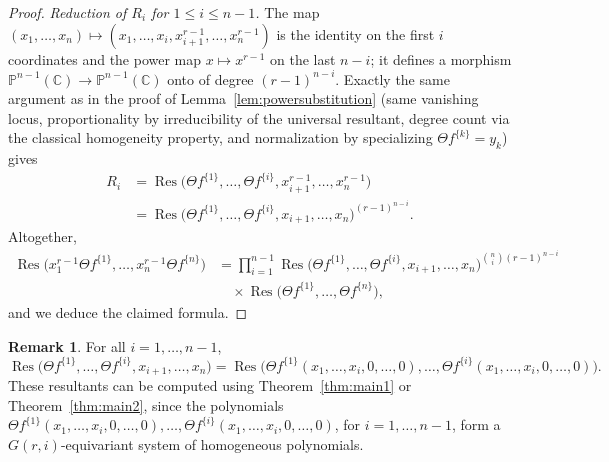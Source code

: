 \documentclass[12pt]{amsart}
\theoremstyle{definition}
\newtheorem{remark}[theorem]{Remark}
\newcommand{\Res}{\operatorname{Res}}
\begin{document}
\begin{proof}
\emph{Reduction of $R_i$ for $1\leqslant i \leqslant n-1$.} The map $(x_1,\dots,x_n) \mapsto (x_1,\dots,x_i,x_{i+1}^{r-1},\dots,x_n^{r-1})$ is the identity on the first $i$ coordinates and the power map $x\mapsto x^{r-1}$ on the last $n-i$; it defines a morphism $\mathbb{P}^{n-1}(\mathbb{C})\to\mathbb{P}^{n-1}(\mathbb{C})$ onto of degree $(r-1)^{n-i}$. Exactly the same argument as in the proof of Lemma~\ref{lem:powersubstitution} (same vanishing locus, proportionality by irreducibility of the universal resultant, degree count via the classical homogeneity property, and normalization by specializing $\Theta f^{\{k\}}=y_k$) gives
\begin{align*}
R_i &= \Res\big(\Theta f^{\{1\}},\dots,\Theta f^{\{i\}},x_{i+1}^{r-1},\dots,x_n^{r-1}\big) \\
&= \Res\big(\Theta f^{\{1\}},\dots,\Theta f^{\{i\}},x_{i+1},\dots,x_n\big)^{(r-1)^{n-i}}.
\end{align*}
Altogether,
\begin{align*}
\Res\big(x_1^{r-1}\Theta f^{\{1\}},\dots,x_n^{r-1}\Theta f^{\{n\}}\big) &= \prod_{i=1}^{n-1}\Res\big(\Theta f^{\{1\}},\dots,\Theta f^{\{i\}},x_{i+1},\dots,x_n\big)^{\binom{n}{i}(r-1)^{n-i}} \\
&\quad\times \Res\big(\Theta f^{\{1\}},\dots,\Theta f^{\{n\}}\big),
\end{align*}
and we deduce the claimed formula.
\end{proof}

\begin{remark}
For all $i=1,\dots,n-1$,
\[
\Res\big(\Theta f^{\{1\}},\dots,\Theta f^{\{i\}},x_{i+1},\dots,x_n\big) = \Res\big(\Theta f^{\{1\}}(x_1,\dots,x_i,0,\dots,0),\dots,\Theta f^{\{i\}}(x_1,\dots,x_i,0,\dots,0)\big).
\]
These resultants can be computed using Theorem~\ref{thm:main1} or Theorem~\ref{thm:main2}, since the polynomials $\Theta f^{\{1\}}(x_1,\dots,x_i,0,\dots,0),\dots,\Theta f^{\{i\}}(x_1,\dots,x_i,0,\dots,0)$, for $i=1,\dots,n-1$, form a $G(r,i)$-equivariant system of homogeneous polynomials.
\end{remark}
\end{document}

